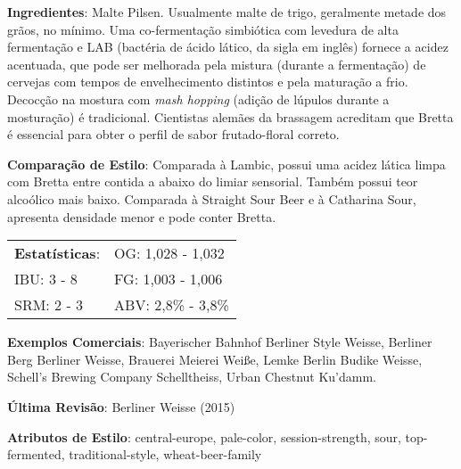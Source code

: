\textbf{Ingredientes}: Malte Pilsen. Usualmente malte de trigo, geralmente metade dos grãos, no mínimo. Uma co-fermentação simbiótica com levedura de alta fermentação e LAB (bactéria de ácido lático, da sigla em inglês) fornece a acidez acentuada, que pode ser melhorada pela mistura (durante a fermentação) de cervejas com tempos de envelhecimento distintos e pela maturação a frio. Decocção na mostura com \textit{mash hopping} (adição de lúpulos durante a mosturação) é tradicional. Cientistas alemães da brassagem acreditam que Bretta é essencial para obter o perfil de sabor frutado-floral correto.

\textbf{Comparação de Estilo}: Comparada à Lambic, possui uma acidez lática limpa com Bretta entre contida a abaixo do limiar sensorial. Também possui teor alcoólico mais baixo. Comparada à Straight Sour Beer e à Catharina Sour, apresenta densidade menor e pode conter Bretta.

\begin{tabular}{@{}p{35mm}p{35mm}@{}}
  \textbf{Estatísticas}: & OG: 1,028 - 1,032 \\
  IBU: 3 - 8  & FG: 1,003 - 1,006  \\
  SRM: 2 - 3  & ABV: 2,8\% - 3,8\%
\end{tabular}

\textbf{Exemplos Comerciais}: Bayerischer Bahnhof Berliner Style Weisse, Berliner Berg Berliner Weisse, Brauerei Meierei Weiße, Lemke Berlin Budike Weisse, Schell's Brewing Company Schelltheiss, Urban Chestnut Ku’damm.

\textbf{Última Revisão}: Berliner Weisse (2015)

\textbf{Atributos de Estilo}: central-europe, pale-color, session-strength, sour, top-fermented, traditional-style, wheat-beer-family
